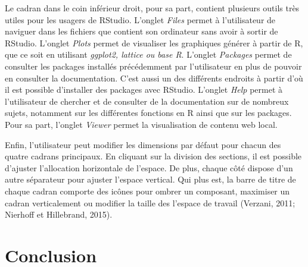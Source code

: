 \documentclass[
  letterpaper,
]{scrbook}
\begin{document}
Le cadran dans le coin inférieur droit, pour sa part, contient plusieurs
outils très utiles pour les usagers de RStudio. L'onglet \emph{Files}
permet à l'utilisateur de naviguer dans les fichiers que contient son
ordinateur sans avoir à sortir de RStudio. L'onglet \emph{Plots} permet
de visualiser les graphiques générer à partir de R, que ce soit en
utilisant \emph{ggplot2, lattice ou base R}. L'onglet \emph{Packages}
permet de consulter les packages installés précédemment par
l'utilisateur en plus de pouvoir en consulter la documentation. C'est
aussi un des différents endroits à partir d'où il est possible
d'installer des packages avec RStudio. L'onglet \emph{Help} permet à
l'utilisateur de chercher et de consulter de la documentation sur de
nombreux sujets, notamment sur les différentes fonctions en R ainsi que
sur les packages. Pour sa part, l'onglet \emph{Viewer} permet la
visualisation de contenu web local.

Enfin, l'utilisateur peut modifier les dimensions par défaut pour chacun
des quatre cadrans principaux. En cliquant sur la division des sections,
il est possible d'ajuster l'allocation horizontale de l'espace. De plus,
chaque côté dispose d'un autre séparateur pour ajuster l'espace
vertical. Qui plus est, la barre de titre de chaque cadran comporte des
icônes pour ombrer un composant, maximiser un cadran verticalement ou
modifier la taille des l'espace de travail (Verzani, 2011; Nierhoff et
Hillebrand, 2015).

\hypertarget{conclusion}{%
\section{Conclusion}\label{conclusion}}
\end{document}
